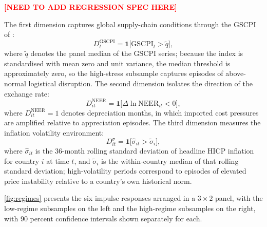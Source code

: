 \documentclass[a4paper,12pt]{article}
\begin{document}
\begin{center}\textcolor{red}{\textbf{[NEED TO ADD REGRESSION SPEC HERE]}} \end{center}

The first dimension captures global supply-chain conditions through the GSCPI of :
\begin{equation*}
    D^{\mathrm{GSCPI}}_t = \mathbf{1}\bigl[\mathrm{GSCPI}_t > \tilde{q}\bigr],
\end{equation*}
where $\tilde{q}$ denotes the panel median of the GSCPI series; because the index is standardised with mean zero and unit variance, the median threshold is approximately zero, so the high-stress subsample captures episodes of above-normal logistical disruption. The second dimension isolates the direction of the exchange rate:
\begin{equation*}
    D^{\mathrm{NEER}}_{it} = \mathbf{1}\bigl[\Delta\ln\mathrm{NEER}_{it} < 0\bigr],
\end{equation*}
where $D^{\mathrm{NEER}}_{it} = 1$ denotes depreciation months, in which imported cost pressures are amplified relative to appreciation episodes. The third dimension measures the inflation volatility environment:
\begin{equation*}
    D^{\sigma}_{it} = \mathbf{1}\bigl[\hat{\sigma}_{it} > \tilde{\sigma}_i\bigr],
\end{equation*}
where $\hat{\sigma}_{it}$ is the 36-month rolling standard deviation of headline HICP inflation for country $i$ at time $t$, and $\tilde{\sigma}_i$ is the within-country median of that rolling standard deviation; high-volatility periods correspond to episodes of elevated price instability relative to a country's own historical norm.

\autoref{fig:regimes} presents the six impulse responses arranged in a $3\times 2$ panel, with the low-regime subsamples on the left and the high-regime subsamples on the right, with 90 percent confidence intervals shown separately for each.
\end{document}
